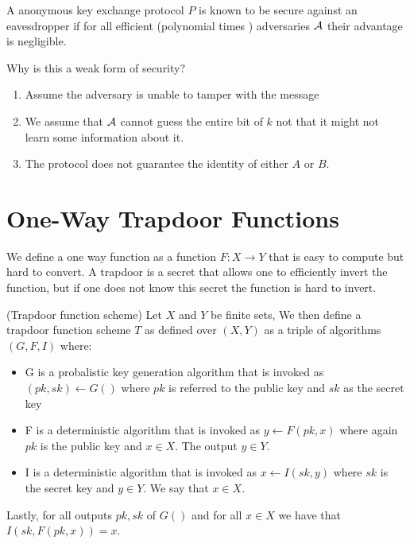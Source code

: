 \begin{definition}
    A anonymous key exchange protocol \(P\) is known to be secure against an eavesdropper if for all efficient (polynomial times ) adversaries \(\mathcal{A}\) their advantage is negligible. 
\end{definition}

\begin{remark}
Why is this a weak form of security? 
\begin{enumerate}
    \item Assume the adversary is unable to tamper with the message 
    \item We assume that \(\mathcal{A}\) cannot guess the entire bit of \(k\) not that it might not learn some information about it. 
    \item The protocol does not guarantee the identity of either \(A\) or \(B\).   
\end{enumerate}
\end{remark}

\section{One-Way Trapdoor Functions}

We define a one way function as a function \(F: X \to Y\) that is easy to compute but hard to convert.  A trapdoor is a secret that allows one to efficiently invert the function, but if one does not know this secret the function is hard to invert.  

\begin{definition}(Trapdoor function scheme)
    Let \(X\) and \(Y\) be finite sets, We then define a trapdoor function scheme \(T\) as defined over \((X,Y)\)  as a triple of algorithms \((G,F,I)\) where: 
    \begin{itemize}
        \item G is a probalistic key generation algorithm that is invoked as \((pk, sk) \gets G()\) where \(pk\) is referred to the public key and \(sk\) as the secret key 
        \item F is a deterministic algorithm that is invoked as \(y \gets F(pk, x)\) where again \(pk\) is the public key and \(x \in X\). The output \(y \in Y\). 
        \item I is a deterministic algorithm that is invoked as \(x \gets I(sk, y)\) where \(sk\) is the secret key and \(y \in Y\). We say that \(x \in X\). 
        
    \end{itemize}
    Lastly, for all outputs \(pk, sk\) of \(G()\) and for all \(x \in X\) we have that \(I(sk, F(pk, x)) = x\).  
\end{definition}

